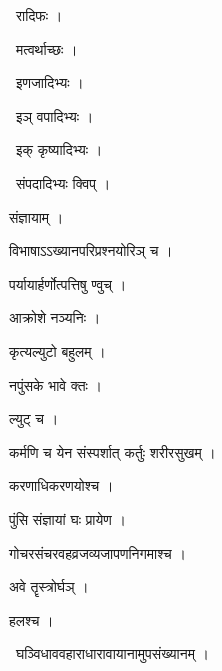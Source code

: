 \documentclass[10pt, openany, oneside]{book}
\begin{document}
\par\noindent\hspace{1.5em}{\vps वा॰}~{\qt रादिफः ।}

\par\noindent\hspace{1.5em}{\vps वा॰}~{\qt मत्वर्थाच्छः ।}

\par\noindent\hspace{1.5em}{\vps वा॰}~{\qt इणजादिभ्यः ।}

\par\noindent\hspace{1.5em}{\vps वा॰}~{\qt इञ् वपादिभ्यः ।}

\par\noindent\hspace{1.5em}{\vps वा॰}~{\qt इक् कृष्यादिभ्यः ।}

\par\noindent\hspace{1.5em}{\vps वा॰}~{\qt संपदादिभ्यः क्विप् ।}

\noindent संज्ञायाम् ।

\noindent विभाषाऽऽख्यानपरिप्रश्नयोरिञ् च ।

\noindent पर्यायार्हर्णोत्पत्तिषु ण्वुच् ।

\noindent आक्रोशे नञ्यनिः ।

\noindent कृत्यल्युटो बहुलम् ।

\noindent नपुंसके भावे क्तः ।

\noindent ल्युट् च ।

\noindent कर्मणि च येन संस्पर्शात् कर्तुः शरीरसुखम् ।

\noindent करणाधिकरणयोश्च ।

\noindent पुंसि संज्ञायां घः प्रायेण ।

\noindent गोचरसंचरवहव्रजव्यजापणनिगमाश्च ।

\noindent अवे तॄस्त्रोर्घञ् ।

\noindent हलश्च ।

\par\noindent\hspace{1.5em}{\vps वा॰}~{\qt घञ्विधाववहाराधारावायानामुपसंख्यानम् ।}
\end{document}
